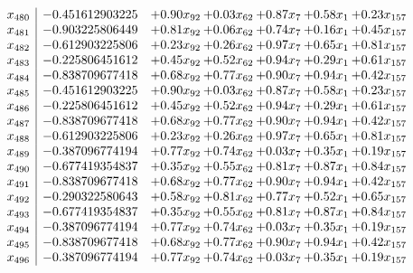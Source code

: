 \documentclass[8pt]{article}
\begin{document}
\[\begin{array}{c| c c@{\hskip 2pt} c@{\hskip 2pt} c@{\hskip 2pt} c@{\hskip 2pt} c@{\hskip 2pt} }
 x_{480}   &  -0.451612903225 & +  0.90 x_{92} & +  0.03 x_{62} & +  0.87 x_{7} & +  0.58 x_{1} & +  0.23 x_{157}\\
 x_{481}   &  -0.903225806449 & +  0.81 x_{92} & +  0.06 x_{62} & +  0.74 x_{7} & +  0.16 x_{1} & +  0.45 x_{157}\\
 x_{482}   &  -0.612903225806 & +  0.23 x_{92} & +  0.26 x_{62} & +  0.97 x_{7} & +  0.65 x_{1} & +  0.81 x_{157}\\
 x_{483}   &  -0.225806451612 & +  0.45 x_{92} & +  0.52 x_{62} & +  0.94 x_{7} & +  0.29 x_{1} & +  0.61 x_{157}\\
 x_{484}   &  -0.838709677418 & +  0.68 x_{92} & +  0.77 x_{62} & +  0.90 x_{7} & +  0.94 x_{1} & +  0.42 x_{157}\\
 x_{485}   &  -0.451612903225 & +  0.90 x_{92} & +  0.03 x_{62} & +  0.87 x_{7} & +  0.58 x_{1} & +  0.23 x_{157}\\
 x_{486}   &  -0.225806451612 & +  0.45 x_{92} & +  0.52 x_{62} & +  0.94 x_{7} & +  0.29 x_{1} & +  0.61 x_{157}\\
 x_{487}   &  -0.838709677418 & +  0.68 x_{92} & +  0.77 x_{62} & +  0.90 x_{7} & +  0.94 x_{1} & +  0.42 x_{157}\\
 x_{488}   &  -0.612903225806 & +  0.23 x_{92} & +  0.26 x_{62} & +  0.97 x_{7} & +  0.65 x_{1} & +  0.81 x_{157}\\
 x_{489}   &  -0.387096774194 & +  0.77 x_{92} & +  0.74 x_{62} & +  0.03 x_{7} & +  0.35 x_{1} & +  0.19 x_{157}\\
 x_{490}   &  -0.677419354837 & +  0.35 x_{92} & +  0.55 x_{62} & +  0.81 x_{7} & +  0.87 x_{1} & +  0.84 x_{157}\\
 x_{491}   &  -0.838709677418 & +  0.68 x_{92} & +  0.77 x_{62} & +  0.90 x_{7} & +  0.94 x_{1} & +  0.42 x_{157}\\
 x_{492}   &  -0.290322580643 & +  0.58 x_{92} & +  0.81 x_{62} & +  0.77 x_{7} & +  0.52 x_{1} & +  0.65 x_{157}\\
 x_{493}   &  -0.677419354837 & +  0.35 x_{92} & +  0.55 x_{62} & +  0.81 x_{7} & +  0.87 x_{1} & +  0.84 x_{157}\\
 x_{494}   &  -0.387096774194 & +  0.77 x_{92} & +  0.74 x_{62} & +  0.03 x_{7} & +  0.35 x_{1} & +  0.19 x_{157}\\
 x_{495}   &  -0.838709677418 & +  0.68 x_{92} & +  0.77 x_{62} & +  0.90 x_{7} & +  0.94 x_{1} & +  0.42 x_{157}\\
 x_{496}   &  -0.387096774194 & +  0.77 x_{92} & +  0.74 x_{62} & +  0.03 x_{7} & +  0.35 x_{1} & +  0.19 x_{157}\\

\end{array}\]
\end{document}
